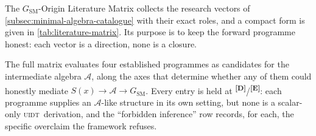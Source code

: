 \documentclass[12pt,a4paper,twoside]{article}
\theoremstyle{plain}
\theoremstyle{definition}
\theoremstyle{remark}
\newcommand{\UIDT}{\textsc{uidt}}
\newcommand{\catmark}[1]{\textsuperscript{\textsf{\textbf{[#1]}}}}
\begin{document}
The $G_{\mathrm{SM}}$-Origin Literature Matrix collects the research vectors of \cref{subsec:minimal-algebra-catalogue} with their exact roles, and a compact form is given in \cref{tab:literature-matrix}. Its purpose is to keep the forward programme honest: each vector is a direction, none is a closure.

The full matrix evaluates four established programmes as candidates for the intermediate algebra $\mathcal{A}$, along the axes that determine whether any of them could honestly mediate $S(x)\to\mathcal{A}\to G_{\mathrm{SM}}$. Every entry is held at \catmark{D}/\catmark{E}: each programme supplies an $\mathcal{A}$-like structure in its own setting, but none is a scalar-only \UIDT\ derivation, and the ``forbidden inference'' row records, for each, the specific overclaim the framework refuses.
\end{document}
